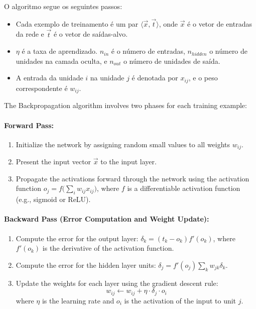 \documentclass{article}
\begin{document}
O algoritmo segue os seguintes passos:

\begin{itemize}
\item Cada exemplo de treinamento é um par $\langle \Vec{x}, \Vec{t} \rangle$, onde $\Vec{x}$ é o vetor de entradas da rede e $\Vec{t}$ é o vetor de saídas-alvo.
\item $\eta$ é a taxa de aprendizado. $n_{in}$ é o número de entradas, $n_{hidden}$ o número de unidades na camada oculta, e $n_{out}$ o número de unidades de saída.
\item A entrada da unidade $i$ na unidade $j$ é denotada por $x_{ij}$, e o peso correspondente é $w_{ij}$.
\end{itemize}

The Backpropagation algorithm involves two phases for each training example:

\paragraph{Forward Pass:} 
\begin{enumerate}
    \item Initialize the network by assigning random small values to all weights $w_{ij}$.
    \item Present the input vector $\Vec{x}$ to the input layer.
    \item Propagate the activations forward through the network using the activation function $o_j = f\big( \sum_i w_{ij} x_{ij} \big)$, where $f$ is a differentiable activation function (e.g., sigmoid or ReLU).
\end{enumerate}

\paragraph{Backward Pass (Error Computation and Weight Update):}
\begin{enumerate}
    \item Compute the error for the output layer: $\delta_k = (t_k - o_k)f'(o_k)$, where $f'(o_k)$ is the derivative of the activation function.
    \item Compute the error for the hidden layer units: $\delta_j = f'(o_j) \sum_k w_{jk} \delta_k$.
    \item Update the weights for each layer using the gradient descent rule:
    \begin{equation}
        w_{ij} \leftarrow w_{ij} + \eta \cdot \delta_j \cdot o_i
    \end{equation}
    where $\eta$ is the learning rate and $o_i$ is the activation of the input to unit $j$.
\end{enumerate}
\end{document}
